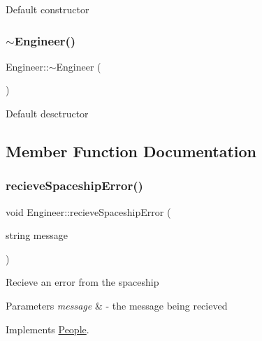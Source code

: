 Default constructor \mbox{\label{classEngineer_a953bdbf091d5bd435d0c9a276f05cb3b}} 
\subsubsection{\texorpdfstring{$\sim$\+Engineer()}{~Engineer()}}
{\footnotesize\ttfamily Engineer\+::$\sim$\+Engineer (\begin{DoxyParamCaption}{ }\end{DoxyParamCaption})\hspace{0.3cm}{\ttfamily [inline]}}

Default desctructor 

\subsection{Member Function Documentation}
\mbox{\label{classEngineer_acc86ce6b4b1388be8ebacc685f9e6233}} 
\subsubsection{\texorpdfstring{recieve\+Spaceship\+Error()}{recieveSpaceshipError()}}
{\footnotesize\ttfamily void Engineer\+::recieve\+Spaceship\+Error (\begin{DoxyParamCaption}\item[{string}]{message }\end{DoxyParamCaption})\hspace{0.3cm}{\ttfamily [virtual]}}

Recieve an error from the spaceship 
\begin{DoxyParams}{Parameters}
{\em message} & -\/ the message being recieved \\
\hline
\end{DoxyParams}


Implements \hyperlink{classPeople_a0685df78be631783138865e03cc7c85d}{People}.

\mbox{\label{classEngineer_ae60806f33b7f226891dbb7ad9b8a0c0b}} 
